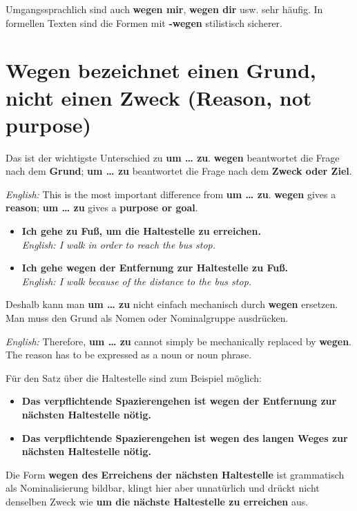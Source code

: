 \documentclass[a4paper]{article}
\begin{document}
   Umgangssprachlich sind auch \textbf{wegen mir}, \textbf{wegen dir} usw. sehr häufig. In formellen Texten sind die Formen mit \textbf{-wegen} stilistisch sicherer.

   \section{Wegen bezeichnet einen Grund, nicht einen Zweck \textnormal{(Reason, not purpose)}}

   Das ist der wichtigste Unterschied zu \textbf{um \ldots{} zu}. \textbf{wegen} beantwortet die Frage nach dem \textbf{Grund}; \textbf{um \ldots{} zu} beantwortet die Frage nach dem \textbf{Zweck oder Ziel}.

   \textit{English:} This is the most important difference from \textbf{um \ldots{} zu}. \textbf{wegen} gives a \textbf{reason}; \textbf{um \ldots{} zu} gives a \textbf{purpose or goal}.

   \begin{itemize}
      \item \textbf{Ich gehe zu Fuß, um die Haltestelle zu erreichen.}\\
      \textit{English: I walk in order to reach the bus stop.}
      \item \textbf{Ich gehe wegen der Entfernung zur Haltestelle zu Fuß.}\\
      \textit{English: I walk because of the distance to the bus stop.}
   \end{itemize}

   Deshalb kann man \textbf{um \ldots{} zu} nicht einfach mechanisch durch \textbf{wegen} ersetzen. Man muss den Grund als Nomen oder Nominalgruppe ausdrücken.

   \textit{English:} Therefore, \textbf{um \ldots{} zu} cannot simply be mechanically replaced by \textbf{wegen}. The reason has to be expressed as a noun or noun phrase.

   Für den Satz über die Haltestelle sind zum Beispiel möglich:

   \begin{itemize}
      \item \textbf{Das verpflichtende Spazierengehen ist wegen der Entfernung zur nächsten Haltestelle nötig.}
      \item \textbf{Das verpflichtende Spazierengehen ist wegen des langen Weges zur nächsten Haltestelle nötig.}
   \end{itemize}

   Die Form \textbf{wegen des Erreichens der nächsten Haltestelle} ist grammatisch als Nominalisierung bildbar, klingt hier aber unnatürlich und drückt nicht denselben Zweck wie \textbf{um die nächste Haltestelle zu erreichen} aus.
\end{document}
